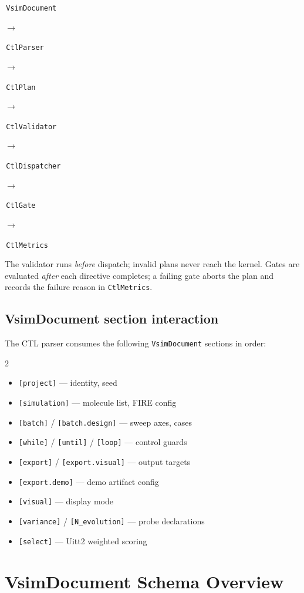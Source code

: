 ﻿\documentclass[11pt,a4paper]{article}
\newcommand{\pipenode}[1]{%
  \colorbox{GrayLight}{\strut\,\footnotesize#1\,}}
\newcommand{\pipearrow}{\;\textcolor{GrayMid}{$\to$}\;}
\begin{document}
\medskip\noindent
\pipenode{\texttt{VsimDocument}}
\pipearrow\pipenode{\texttt{CtlParser}}
\pipearrow\pipenode{\texttt{CtlPlan}}
\pipearrow\pipenode{\texttt{CtlValidator}}
\par\noindent\hspace{2em}\pipearrow\pipenode{\texttt{CtlDispatcher}}
\pipearrow\pipenode{\texttt{CtlGate}}
\pipearrow\pipenode{\texttt{CtlMetrics}}
\medskip

The validator runs \emph{before} dispatch; invalid plans never reach the kernel.
Gates are evaluated \emph{after} each directive completes; a failing gate aborts
the plan and records the failure reason in \texttt{CtlMetrics}.

\subsection*{VsimDocument section interaction}

The CTL parser consumes the following \texttt{VsimDocument} sections in order:

\begin{multicols}{2}
\begin{itemize}[leftmargin=*,itemsep=2pt]
  \item \texttt{[project]} --- identity, seed
  \item \texttt{[simulation]} --- molecule list, FIRE config
  \item \texttt{[batch]} / \texttt{[batch.design]} --- sweep axes, cases
  \item \texttt{[while]} / \texttt{[until]} / \texttt{[loop]} --- control guards
  \item \texttt{[export]} / \texttt{[export.visual]} --- output targets
  \item \texttt{[export.demo]} --- demo artifact config
  \item \texttt{[visual]} --- display mode
  \item \texttt{[variance]} / \texttt{[N\_evolution]} --- probe declarations
  \item \texttt{[select]} --- Uitt2 weighted scoring
\end{itemize}
\end{multicols}

\newpage
\section{VsimDocument Schema Overview}
\label{sec:schema}
\end{document}

